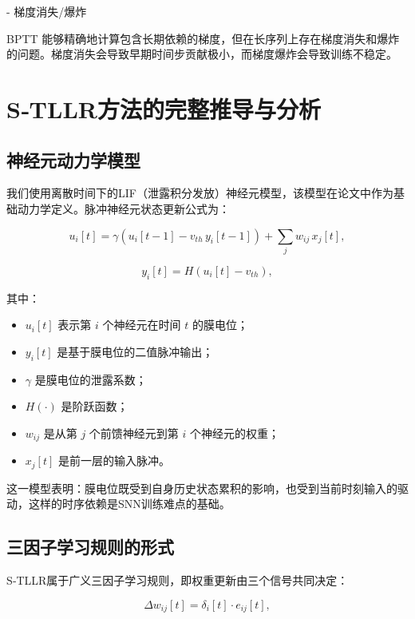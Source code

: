 \documentclass[journal,12pt,onecolumn]{IEEEtran}
\begin{document}
- 梯度消失/爆炸

BPTT 能够精确地计算包含长期依赖的梯度，但在长序列上存在梯度消失和爆炸的问题。梯度消失会导致早期时间步贡献极小，而梯度爆炸会导致训练不稳定。

\section{S‑TLLR方法的完整推导与分析\cite{apolinario2023s}}

\subsection{神经元动力学模型}

我们使用离散时间下的LIF（泄露积分发放）神经元模型，该模型在论文中作为基础动力学定义。脉冲神经元状态更新公式为：

\begin{equation}
u_i[t] = \gamma (u_i[t-1] - v_{th} \, y_i[t-1]) + \sum_j w_{ij}\, x_j[t],
\end{equation}

\begin{equation}
y_i[t] = H(u_i[t] - v_{th}),
\end{equation}

其中：
\begin{itemize}
    \item $u_i[t]$ 表示第 $i$ 个神经元在时间 $t$ 的膜电位；
    \item $y_i[t]$ 是基于膜电位的二值脉冲输出；
    \item $\gamma$ 是膜电位的泄露系数；
    \item $H(\cdot)$ 是阶跃函数；
    \item $w_{ij}$ 是从第 $j$ 个前馈神经元到第 $i$ 个神经元的权重；
    \item $x_j[t]$ 是前一层的输入脉冲。
\end{itemize}

这一模型表明：膜电位既受到自身历史状态累积的影响，也受到当前时刻输入的驱动，这样的时序依赖是SNN训练难点的基础。

\subsection{三因子学习规则的形式}

S‑TLLR属于广义三因子学习规则，即权重更新由三个信号共同决定：

\begin{equation}
\Delta w_{ij}[t] = \delta_i[t] \cdot e_{ij}[t],
\end{equation}
\end{document}
